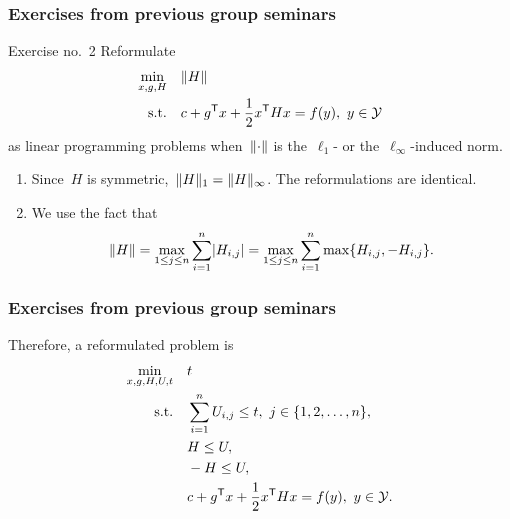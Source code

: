 \documentclass{polyu-presentation}
\newcommand{\obj}{f}
\newcommand{\xpt}[1][]{\mathcal{Y}\ifthenelse{\equal{#1}{}}{}{^{#1}}}
\begin{document}
\begin{frame}
    \frametitle{Exercises from previous group seminars}

    \begin{block}{Exercise no.\ 2}
        Reformulate
        \begin{align*}
            \min_{x, g, H}  & \quad \norm{H}\\
            \text{s.t.}     & \quad c + g^{\T} x + \frac{1}{2} x^{\T} H x = \obj(y), ~ y \in \xpt
        \end{align*}
        as \alert{linear programming} problems when~$\lVert\cdot\rVert$ is the~$\ell_1$- or the~$\ell_{\infty}$-induced norm.
    \end{block}

    \bigskip

    \begin{enumerate}
        \item Since~$H$ is \alert{symmetric},~$\lVert H\rVert_1 = \lVert H\rVert_{\infty}$.
        The reformulations are \alert{identical}.
        \item We use the fact that
        \begin{equation*}
            \lVert H\rVert = \max_{1 \le j \le n} \sum_{i = 1}^n \lvert H_{i, j}\rvert = \max_{1 \le j \le n} \sum_{i = 1}^n \max \{H_{i, j}, -H_{i, j}\}.
        \end{equation*}
    \end{enumerate}
\end{frame}

\begin{frame}
    \frametitle{Exercises from previous group seminars}

    Therefore, a \alert{reformulated problem} is
        \begin{align*}
            \min_{x, g, H, U, t}    & \quad t\\
            \text{s.t.}             & \quad \sum_{i = 1}^n U_{i, j} \le t, ~ j \in \set{1, 2, \dots, n},\\
                                    & \quad H \le U,\\
                                    & \quad -H \le U,\\
                                    & \quad c + g^{\T} x + \frac{1}{2} x^{\T} H x = \obj(y), ~ y \in \xpt.
        \end{align*}
\end{frame}
\end{document}
